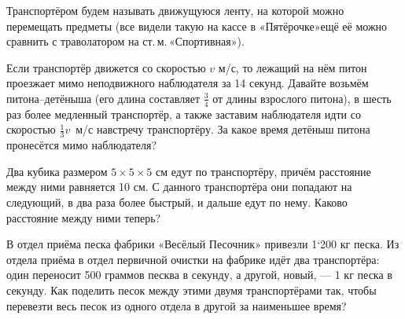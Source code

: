 ﻿
\noindent Транспортёром будем называть движущуюся ленту, на которой можно перемещать предметы (все видели такую на кассе в «Пятёрочке»\scolon ещё её можно сравнить с траволатором на ст.\,м.\,«Спортивная»).

\begin{enumerate}
\itA Если транспортёр движется со скоростью $v$ м/с, то лежащий на нём питон проезжает мимо неподвижного наблюдателя за 14 секунд. Давайте возьмём питона–детёныша (его длина составляет $\tfrac{3}{4}$ от длины взрослого питона), в шесть раз более медленный транспортёр, а также заставим наблюдателя идти со скоростью $\tfrac{1}{3}v$~м/с навстречу транспортёру. За какое время детёныш питона пронесётся мимо наблюдателя?

\itB Два кубика размером $5 \times 5 \times 5$ см едут по транспортёру, причём расстояние между ними равняется 10 см. С данного транспортёра они попадают на следующий, в два раза более быстрый, и дальше едут по нему. Каково расстояние между ними теперь?

\itC В отдел приёма песка фабрики «Весёлый Песочник» привезли 1`200 кг песка. Из отдела приёма в отдел первичной очистки на фабрике идёт два транспортёра: один переносит 500 граммов песква в секунду, а другой, новый, — 1 кг песка в секунду. Как поделить песок между этими двумя транспортёрами так, чтобы перевезти весь песок из одного отдела в другой за наименьшее время?
\end{enumerate}